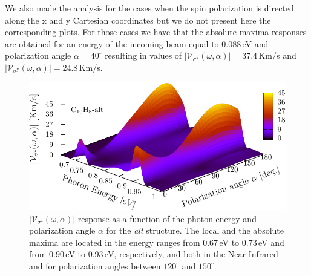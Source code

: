 \documentclass[prb,11pt,tightenlines,twocolumn,aps]{revtex4-1}
\begin{document}
% 
We also made the analysis for the cases when the spin polarization is directed
along the $\mathrm{x}$ and $\mathrm{y}$ Cartesian coordinates but we do not
present here the corresponding plots. For those cases we have that the absolute
maxima responses are obtained for an energy of the incoming beam equal to
0.088\,eV and polarization angle $\alpha=40^{\circ}$ resulting in values of
$|\mathcal{V}_{\sigma^{\mathrm{x}}}(\omega,\alpha)|=37.4$\,Km/s and
$|\mathcal{V}_{\sigma^{\mathrm{y}}}(\omega,\alpha)|=24.8$\,Km/s.


\begin{figure}[tb]
    \centering
    \includegraphics[width=\linewidth]{altplots/alt-3d-svaz}
    \caption{$|\mathcal{V}_{\sigma^{\mathrm{z}}}(\omega,\alpha)|$ response
    as a function of the photon energy and polarization angle $\alpha$  for the
    \emph{alt} structure. The local and the absolute maxima are located in the
    energy ranges from 0.67\,eV to 0.73\,eV and from 0.90\,eV to 0.93\,eV,
    respectively, and both in the Near Infrared and for polarization angles
    between $120^{\circ}$ and $150^{\circ}$.}
    \label{fig:alt-3d-vsb}
\end{figure}
\end{document}
